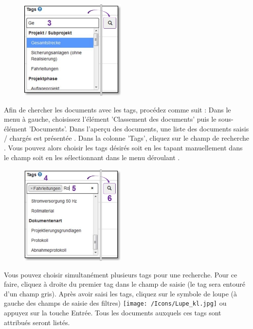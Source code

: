\begin{figure}
\vspace{-10pt}
\includegraphics[height=50mm]{../chapters/11_Dokumentenablage/pictures/11-2-8_DokTagHinzufuegen.jpg}
\end{figure}
Afin de chercher les documents avec les tags, procédez comme suit : 
Dans le menu à gauche, choisissez l'élément 'Classement des documents' puis le sous-élément 'Documents'. Dans l'aperçu des documents, une liste des documents saisis / chargés est présentée . Dans la colonne 'Tags', cliquez sur le champ de recherche . Vous pouvez alors choisir les tags désirés soit en les tapant manuellement dans le champ soit en les sélectionnant dans le menu déroulant .

\vspace{\baselineskip}

\begin{figure}
\vspace{-30pt}
\includegraphics[height=50mm]{../chapters/11_Dokumentenablage/pictures/11-2-8_TagEingabe.jpg}
\end{figure}
Vous pouvez choisir simultanément plusieurs tags pour une recherche. Pour ce faire, cliquez à droite du premier tag  dans le champ de saisie  (le tag sera entouré d'un champ gris). Après avoir saisi les tags, cliquez sur le symbole de loupe (à gauche des champs de saisie des filtres) \texttt{[image: /Icons/Lupe\_kl.jpg]}  ou appuyez sur la touche Entrée. Tous les documents auxquels ces tags sont attribués seront listés.

